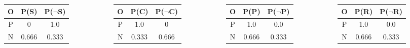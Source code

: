 \documentclass[aspectratio=169, 10pt]{beamer}
\begin{document}
\begin{frame}[t]
    \begin{columns}
        \begin{column}{0.25\textwidth}
            \begin{table}[]
                \small
                \begin{tabular}{ccc}
                O & P(S) & P($\neg$S) \\ \hline
                P & 0 & 1.0 \\
                N & 0.666 & 0.333 \\
                \end{tabular}
            \end{table}
        \end{column}
        \begin{column}{0.25\textwidth}
            \begin{table}[]
                \small
                \begin{tabular}{ccc}
                O & P(C) & P($\neg$C) \\ \hline
                P & 1.0 & 0 \\
                N & 0.333 & 0.666 \\
                \end{tabular}
            \end{table}
        \end{column}
        \begin{column}{0.25\textwidth}
            \begin{table}[]
                \small
                \begin{tabular}{ccc}
                O & P(P) & P($\neg$P) \\ \hline
                P & 1.0 & 0.0 \\
                N & 0.666 & 0.333 \\
                \end{tabular}
            \end{table}
        \end{column}
        \begin{column}{0.25\textwidth}
            \begin{table}[]
                \small
                \begin{tabular}{ccc}
                O & P(R) & P($\neg$R) \\ \hline
                P & 1.0 & 0.0 \\
                N & 0.666 & 0.333 \\
                \end{tabular}
            \end{table}
        \end{column}
    \end{columns}

\end{frame}
\end{document}
